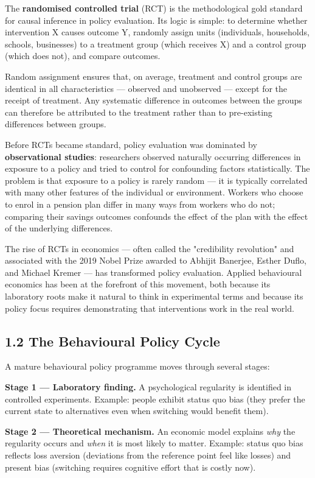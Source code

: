 \documentclass[12pt, letterpaper]{article}
\begin{document}
The \textbf{randomised controlled trial} (RCT) is the methodological gold standard for causal inference in policy evaluation. Its logic is simple: to determine whether intervention X causes outcome Y, randomly assign units (individuals, households, schools, businesses) to a treatment group (which receives X) and a control group (which does not), and compare outcomes.

Random assignment ensures that, on average, treatment and control groups are identical in all characteristics --- observed and unobserved --- except for the receipt of treatment. Any systematic difference in outcomes between the groups can therefore be attributed to the treatment rather than to pre-existing differences between groups.

Before RCTs became standard, policy evaluation was dominated by \textbf{observational studies}: researchers observed naturally occurring differences in exposure to a policy and tried to control for confounding factors statistically. The problem is that exposure to a policy is rarely random --- it is typically correlated with many other features of the individual or environment. Workers who choose to enrol in a pension plan differ in many ways from workers who do not; comparing their savings outcomes confounds the effect of the plan with the effect of the underlying differences.

The rise of RCTs in economics --- often called the "credibility revolution" and associated with the 2019 Nobel Prize awarded to Abhijit Banerjee, Esther Duflo, and Michael Kremer --- has transformed policy evaluation. Applied behavioural economics has been at the forefront of this movement, both because its laboratory roots make it natural to think in experimental terms and because its policy focus requires demonstrating that interventions work in the real world.


\subsection{1.2 The Behavioural Policy Cycle}


A mature behavioural policy programme moves through several stages:

\textbf{Stage 1 --- Laboratory finding.} A psychological regularity is identified in controlled experiments. Example: people exhibit status quo bias (they prefer the current state to alternatives even when switching would benefit them).

\textbf{Stage 2 --- Theoretical mechanism.} An economic model explains \textit{why} the regularity occurs and \textit{when} it is most likely to matter. Example: status quo bias reflects loss aversion (deviations from the reference point feel like losses) and present bias (switching requires cognitive effort that is costly now).
\end{document}
